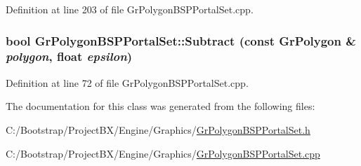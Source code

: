 Definition at line 203 of file GrPolygonBSPPortalSet.cpp.\hypertarget{class_gr_polygon_b_s_p_portal_set_c5d3b95b76f34209537fcbe66e47aa9f}{
\subsubsection[{Subtract}]{\setlength{\rightskip}{0pt plus 5cm}bool GrPolygonBSPPortalSet::Subtract (const {\bf GrPolygon} \& {\em polygon}, \/  float {\em epsilon})}}
\label{class_gr_polygon_b_s_p_portal_set_c5d3b95b76f34209537fcbe66e47aa9f}




Definition at line 72 of file GrPolygonBSPPortalSet.cpp.

The documentation for this class was generated from the following files:\begin{CompactItemize}
\item 
C:/Bootstrap/ProjectBX/Engine/Graphics/\hyperlink{_gr_polygon_b_s_p_portal_set_8h}{GrPolygonBSPPortalSet.h}\item 
C:/Bootstrap/ProjectBX/Engine/Graphics/\hyperlink{_gr_polygon_b_s_p_portal_set_8cpp}{GrPolygonBSPPortalSet.cpp}\end{CompactItemize}
